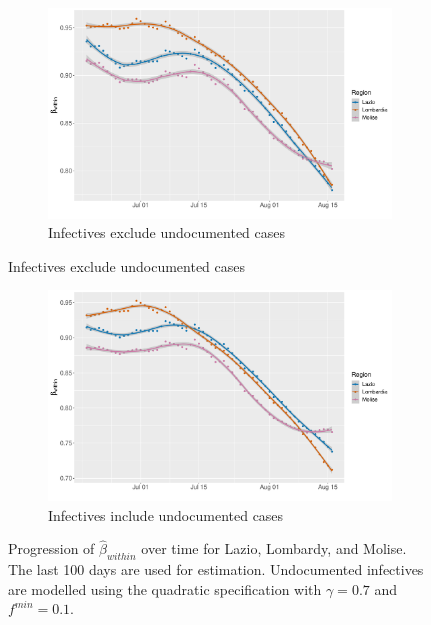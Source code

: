 \documentclass[12pt]{article}
\begin{document}
	\begin{figure}[H]
	    \centering
	    \begin{subfigure}{\textwidth}
	      \centering
	      \includegraphics[width=0.94\linewidth]{output/model_within_lag14_betawithin_compare_rolling.pdf}
	      \caption{Infectives exclude undocumented cases}
	      \label{fig:model_within_compare_highest_regular}
	    \end{subfigure}
    \end{figure}
    \begin{figure}[H]\ContinuedFloat
	    \begin{subfigure}{\textwidth}
	      \centering
	      \includegraphics[width=0.94\linewidth]{output/model_within_lag14_betawithin_compare_UndocQuadratic_rolling.pdf}
	      \caption{Infectives include undocumented cases}
	      \label{fig:model_within_compare_highest_undoc}
	    \end{subfigure}
	    \caption{Progression of $\widehat{\beta}_{within}$ over time for Lazio, Lombardy, and Molise. The last 100 days are used for estimation. Undocumented infectives are modelled using the quadratic specification with $\gamma = 0.7$ and $f^{min}=0.1$.}
	    \label{fig:model_within_compare_highest}
    \end{figure}
	
\end{document}
